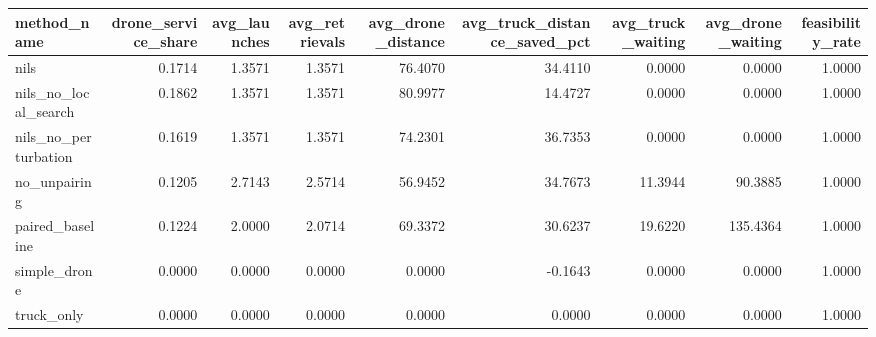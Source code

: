 \begin{tabular}{lrrrrrrrr}
\toprule
method_name & drone_service_share & avg_launches & avg_retrievals & avg_drone_distance & avg_truck_distance_saved_pct & avg_truck_waiting & avg_drone_waiting & feasibility_rate \\
\midrule
nils & 0.1714 & 1.3571 & 1.3571 & 76.4070 & 34.4110 & 0.0000 & 0.0000 & 1.0000 \\
nils_no_local_search & 0.1862 & 1.3571 & 1.3571 & 80.9977 & 14.4727 & 0.0000 & 0.0000 & 1.0000 \\
nils_no_perturbation & 0.1619 & 1.3571 & 1.3571 & 74.2301 & 36.7353 & 0.0000 & 0.0000 & 1.0000 \\
no_unpairing & 0.1205 & 2.7143 & 2.5714 & 56.9452 & 34.7673 & 11.3944 & 90.3885 & 1.0000 \\
paired_baseline & 0.1224 & 2.0000 & 2.0714 & 69.3372 & 30.6237 & 19.6220 & 135.4364 & 1.0000 \\
simple_drone & 0.0000 & 0.0000 & 0.0000 & 0.0000 & -0.1643 & 0.0000 & 0.0000 & 1.0000 \\
truck_only & 0.0000 & 0.0000 & 0.0000 & 0.0000 & 0.0000 & 0.0000 & 0.0000 & 1.0000 \\
\bottomrule
\end{tabular}
